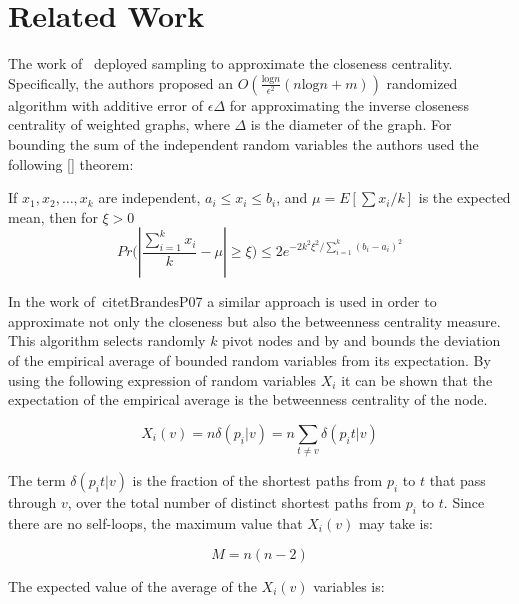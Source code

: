 \section{Related Work}\label{sec:prevwork}

The work of~\citet{EppsteinW01} deployed sampling to approximate the closeness centrality.
Specifically, the authors proposed an $O(\frac{\mbox{log}n}{\epsilon^2}(n\mbox{log}n+m))$ randomized algorithm with additive error of $\epsilon \Delta$ for approximating the inverse closeness centrality of weighted graphs, where $\Delta$ is the diameter of the graph.
For bounding the sum of the independent random variables the authors used the following [] theorem:

\begin{theorem}
If $x_{1},x_{2},\ldots,x_{k}$ are independent, $a_{i}\leq x_{i}\leq b_{i}$, and $\mu=E[\sum x_{i}/k]$ is the expected mean, then for $\xi > 0$
\begin{displaymath}
Pr\Big( |\frac{\sum_{i=1}^{k}x_{i}}{k}-\mu|\geq \xi\Big)\leq 2e^{-2k^2\xi^2/\sum_{i=1}^{k}(b_{i}-a_{i})^2}
\end{displaymath}
\end{theorem}

In the work of~citet{BrandesP07} a similar approach is used in order to approximate not only the closeness but also the betweenness centrality measure.
This algorithm selects randomly $k$ pivot nodes and by and bounds the deviation of the empirical average of bounded random variables from its expectation.
By using the following expression of random variables $X_{i}$ it can be shown that the expectation of the empirical average is the betweenness centrality of the node.

\begin{displaymath}
X_{i}(v)=n\delta (p_{i}|v)=n\sum_{t\neq v}\delta (p_{i}t|v)
\end{displaymath}

The term $\delta (p_{i}t|v)$ is the fraction of the shortest paths from $p_{i}$ to $t$ that pass through $v$, over the total number of distinct shortest paths from 
$p_{i}$ to $t$.
Since there are no self-loops, the maximum value that $X_{i}(v)$ may take is:

\begin{displaymath}
M=n(n-2)
\end{displaymath}

The expected value of the average of the $X_{i}(v)$ variables is:

